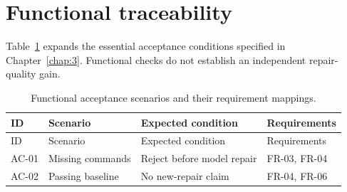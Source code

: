 \section{Functional traceability}\label{functional-traceability}

Table~\ref{tab:A-2} expands the essential acceptance conditions specified in Chapter~\ref{chap:3}. Functional checks do not establish an independent repair-quality gain.

\begin{longtable}[]{@{}
  >{\raggedright\arraybackslash}p{}
  >{\raggedright\arraybackslash}p{}
  >{\raggedright\arraybackslash}p{}
  >{\raggedright\arraybackslash}p{}@{}}
\caption[Acceptance traceability]{Functional acceptance scenarios and their requirement mappings.}\label{tab:A-2}\tabularnewline
\toprule\noalign{}
\begin{minipage}[b]{\linewidth}\raggedright
ID
\end{minipage} & \begin{minipage}[b]{\linewidth}\raggedright
Scenario
\end{minipage} & \begin{minipage}[b]{\linewidth}\raggedright
Expected condition
\end{minipage} & \begin{minipage}[b]{\linewidth}\raggedright
Requirements
\end{minipage} \\
\midrule\noalign{}
\endfirsthead
\toprule\noalign{}
\begin{minipage}[b]{\linewidth}\raggedright
ID
\end{minipage} & \begin{minipage}[b]{\linewidth}\raggedright
Scenario
\end{minipage} & \begin{minipage}[b]{\linewidth}\raggedright
Expected condition
\end{minipage} & \begin{minipage}[b]{\linewidth}\raggedright
Requirements
\end{minipage} \\
\midrule\noalign{}
\endhead
\bottomrule\noalign{}
\endlastfoot
AC-01 & Missing commands & Reject before model repair & FR-03, FR-04 \\
AC-02 & Passing baseline & No new-repair claim & FR-04, FR-06 \\

\end{longtable}
